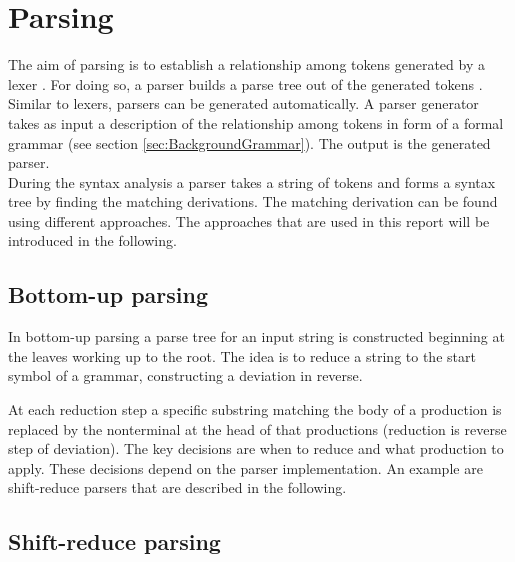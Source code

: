 \section{Parsing}\label{sec:BackgroundParser}

The aim of parsing is to establish a relationship among tokens generated by a lexer \cite{LexYacc.1992}. For doing so, a parser builds a parse tree out of the generated tokens \cite{Mogensen.2017}.\\
Similar to lexers, parsers can be generated automatically.
A parser generator takes as input a description of the relationship among tokens in form of a formal grammar (see section \ref{sec:BackgroundGrammar}). The output is the generated parser. \cite{LexYacc.1992}\\
During the syntax analysis a parser takes a string of tokens and forms a syntax tree by finding the matching derivations. The matching derivation can be found using different approaches. The approaches that are used in this report will be introduced in the following.

\subsection{Bottom-up parsing}\label{sec:BackgroundParserBottomUp}

In bottom-up parsing a parse tree for an input string is constructed beginning at the leaves working up to the root. The idea is to reduce a string to the start symbol of a grammar, constructing a deviation in reverse.
\cite{Aho.2007}

At each reduction step a specific substring matching the body of a production is replaced by the nonterminal at the head of that productions (reduction is reverse step of deviation).
The key decisions are when to reduce and what production to apply.
These decisions depend on the parser implementation.
An example are shift-reduce parsers that are described in the following.

\subsection{Shift-reduce parsing}\label{sec:BackgroundParserShiftReduce}

